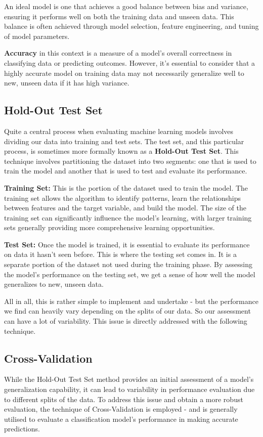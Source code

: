 \documentclass[letterpaper,10pt]{article}
\begin{document}
An ideal model is one that achieves a good balance between bias and variance, ensuring it performs well on both the training data and unseen data. This balance is often achieved through model selection, feature engineering, and tuning of model parameters. \par

\textbf{Accuracy} in this context is a measure of a model's overall correctness in classifying data or predicting outcomes. However, it's essential to consider that a highly accurate model on training data may not necessarily generalize well to new, unseen data if it has high variance. \par


\subsection{Hold-Out Test Set}
Quite a central process when evaluating machine learning models involves dividing our data into training and test sets. The test set, and this particular process, is sometimes more formally known as a \textbf{Hold-Out Test Set}. This technique involves partitioning the dataset into two segments: one that is used to train the model and another that is used to test and evaluate its performance. \par

\textbf{Training Set:} This is the portion of the dataset used to train the model. The training set allows the algorithm to identify patterns, learn the relationships between features and the target variable, and build the model. The size of the training set can significantly influence the model’s learning, with larger training sets generally providing more comprehensive learning opportunities.

\textbf{Test Set:} Once the model is trained, it is essential to evaluate its performance on data it hasn't seen before. This is where the testing set comes in. It is a separate portion of the dataset not used during the training phase. By assessing the model's performance on the testing set, we get a sense of how well the model generalizes to new, unseen data. \par

All in all, this is rather simple to implement and undertake - but the performance we find can heavily vary depending on the splits of our data. So our assessment can have a lot of variability. This issue is directly addressed with the following technique. 

\subsection{Cross-Validation}
While the Hold-Out Test Set method provides an initial assessment of a model's generalization capability, it can lead to variability in performance evaluation due to different splits of the data. To address this issue and obtain a more robust evaluation, the technique of Cross-Validation is employed - and is generally utilised to evaluate a classification model's performance in making accurate predictions. \par
\end{document}
